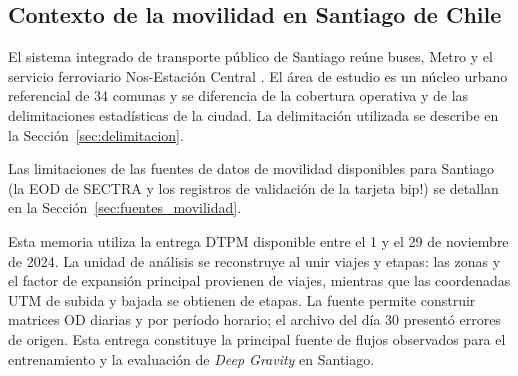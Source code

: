 \subsection{Contexto de la movilidad en Santiago de Chile}

El sistema integrado de transporte público de Santiago reúne buses, Metro y el servicio ferroviario Nos-Estación Central \cite{dtpm_informe_2024}. El área de estudio es un núcleo urbano referencial de 34 comunas y se diferencia de la cobertura operativa y de las delimitaciones estadísticas de la ciudad. La delimitación utilizada se describe en la Sección~\ref{sec:delimitacion}.

Las limitaciones de las fuentes de datos de movilidad disponibles para Santiago (la EOD de SECTRA y los registros de validación de la tarjeta bip!) se detallan en la Sección~\ref{sec:fuentes_movilidad}.

Esta memoria utiliza la entrega DTPM disponible entre el 1 y el 29 de noviembre de 2024. La unidad de análisis se reconstruye al unir viajes y etapas: las zonas y el factor de expansión principal provienen de viajes, mientras que las coordenadas UTM de subida y bajada se obtienen de etapas. La fuente permite construir matrices OD diarias y por período horario; el archivo del día 30 presentó errores de origen. Esta entrega constituye la principal fuente de flujos observados para el entrenamiento y la evaluación de \textit{Deep Gravity} en Santiago.

